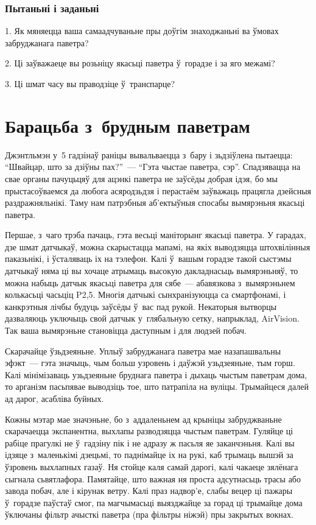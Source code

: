 \subsubsection{Пытаньні і заданьні}

1. Як мяняецца ваша самаадчуваньне пры доўгім знаходжаньні ва ўмовах забруджанага паветра?

2. Ці заўважаеце вы розьніцу якасьці паветра ў~горадзе і за яго межамі?

3. Ці шмат часу вы праводзіце ў~транспарце?


\section{Барацьба з~брудным паветрам}

Джэнтльмэн у~5 гадзінаў раніцы вывальваецца з~бару і зьдзіўлена пытаецца: ``Швайцар, што за дзіўны пах?''~--- ``Гэта чыстае паветра, сэр''. Спадзявацца на свае органы пачуцьцяў для ацэнкі паветра не заўсёды добрая ідэя, бо мы прыстасоўваемся да любога асяродзьдзя і перастаём заўважаць працягла дзейсныя раздражняльнікі. Таму нам патрэбныя аб'ектыўныя спосабы вымярэньня якасьці паветра.

Першае, з~чаго трэба пачаць, гэта весьці маніторынг якасьці паветра. У гарадах, дзе шмат датчыкаў, можна скарыстацца мапамі, на якіх выводзяцца штохвілінныя паказьнікі, і ўсталяваць іх на тэлефон. Калі ў~вашым горадзе такой сыстэмы датчыкаў няма ці вы хочаце атрымаць высокую дакладнасьць вымярэньняў, то можна набыць датчык якасьці паветра для сябе~--- абавязкова з~вымярэньнем колькасьці часьціц P2,5. Многія датчыкі сынхранізуюцца са смартфонамі, і канкрэтныя лічбы будуць заўсёды ў~вас пад рукой. Некаторыя вытворцы дазваляюць уключыць свой датчык у~глябальную сетку, напрыклад, AirVision. Так ваша вымярэньне становіцца даступным і для людзей побач.

Скарачайце ўзьдзеяньне. Уплыў забруджанага паветра мае назапашвальны эфэкт~--- гэта значыць, чым больш узровень і даўжэй узьдзеяньне, тым горш. Калі мінімізаваць узьдзеяньне бруднага паветра і дыхаць чыстым паветрам дома, то арганізм пасьпявае выводзіць тое, што патрапіла на вуліцы. Трымайцеся далей ад дарог, асабліва буйных.

Кожны мэтар мае значэньне, бо з~аддаленьнем ад крыніцы забруджваньне скарачаецца экспанентна, выхлапы разводзяцца чыстым паветрам. Гуляйце ці рабіце прагулкі не ў~гадзіну пік і не адразу ж пасьля яе заканчэньня. Калі вы ідзяце з~маленькімі дзецьмі, то паднімайце іх на рукі, каб трымаць вышэй за ўзровень выхлапных газаў. Ня стойце каля самай дарогі, калі чакаеце зялёнага сыгнала сьвятлафора. Памятайце, што важная ня проста адсутнасьць трасы або завода побач, але і кірунак ветру. Калі праз надвор'е, слабы вецер ці пажары ў~горадзе паўстаў смог, па магчымасьці выязджайце за горад ці трымайце дома ўключаны фільтр ачысткі паветра (пра фільтры ніжэй) пры закрытых вокнах.

